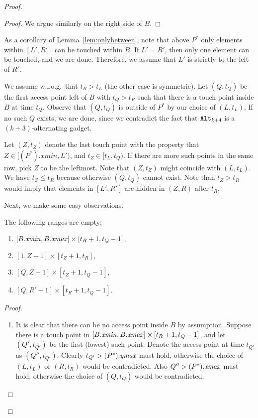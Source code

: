 \begin{proof}
\begin{proof}
We argue similarly on the right side of $B$.
\end{proof}

As a corollary of Lemma~\ref{lem:onlybetween}, note that above $P^*$ only elements within $[L',R']$ can be touched within $B$. %
If $L' = R'$, then only one element can be touched, and we are done. Therefore, we assume that $L'$ is strictly to the left of $R'$.


We assume w.l.o.g.\ that $t_R > t_L$ (the other case is symmetric). Let $(Q,t_Q)$ be the first access point left of $B$ with $t_Q > t_R$ such that there is a touch point inside $B$ at time $t_Q$. Observe that $(Q,t_Q)$ is outside of $P^*$ by our choice of $(L,t_L)$. If no such $Q$ exists, we are done, since we contradict the fact that $\texttt{Alt}_{k+4}$ is a $(k+3)$-alternating gadget. 

Let $(Z, t_Z)$ denote the last touch point with the property that $Z \in [(P^*).xmin, L')$, and $t_Z \in [t_L, t_Q)$. If there are more such points in the same row, pick $Z$ to be the leftmost. Note that $(Z, t_Z)$ might coincide with $(L, t_L)$. We have $t_Z \le t_R$ because otherwise $(Q,t_Q)$ cannot exist. Note than $t_Z > t_R$ would imply that elements in $[L',R']$ are hidden in $(Z,R)$ after $t_R$. 

Next, we make some easy observations.

\begin{lemma}
\label{lem:emptiness}
The following ranges are empty:
\begin{enumerate}[label={{(}\roman*{)}}]
\item $[B.\mathit{xmin}, B.\mathit{xmax}] \times [t_R+1, t_Q-1]$,
\item $[1, Z-1] \times [t_Z+1, t_R]$,
\item $[Q, Z-1] \times [t_Z+1, t_Q-1]$,
\item $[Q, R'-1] \times [t_{R}+1, t_Q-1]$.
\end{enumerate}
\end{lemma} 

\begin{proof}

\begin{enumerate}[label={{(}\roman*{)}}]
\item It is clear that there can be no access point inside $B$ by assumption. Suppose there is a touch point in $[B.\mathit{xmin}, B.\mathit{xmax}] \times [t_R+1, t_Q-1]$, and let $(Q',t_{Q'})$ be the first (lowest) such point. Denote the access point at time $t_{Q'}$ as $(Q'', t_{Q'})$. Clearly $t_{Q'}>(P^*).\mathit{ymax}$ must hold, otherwise the choice of $(L,t_L)$ or $(R,t_R)$ would be contradicted. Also $Q''>(P^*).\mathit{xmax}$ must hold, otherwise the choice of $(Q,t_Q)$ would be contradicted.


\end{enumerate}
\end{proof}
\end{proof}
